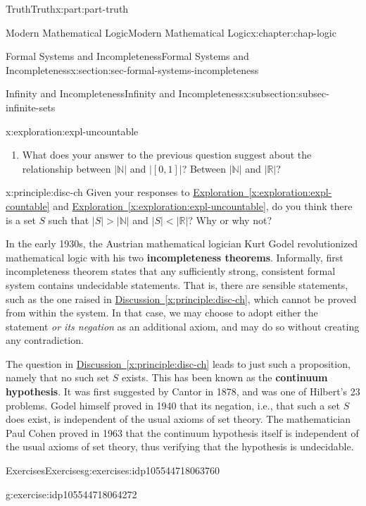 \documentclass[oneside,10pt,]{book}
\newcommand{\xreffont}{\relax}
\newcommand{\terminology}[1]{\textbf{#1}}
\numberwithin{equation}{section}
\newcommand{\lt}{<}
\newcommand{\gt}{>}
\begin{document}
\begin{partptx}{Truth}{}{Truth}{}{}{x:part:part-truth}
\begin{chapterptx}{Modern Mathematical Logic}{}{Modern Mathematical Logic}{}{}{x:chapter:chap-logic}
\begin{sectionptx}{Formal Systems and Incompleteness}{}{Formal Systems and Incompleteness}{}{}{x:section:sec-formal-systems-incompleteness}
\begin{subsectionptx}{Infinity and Incompleteness}{}{Infinity and Incompleteness}{}{}{x:subsection:subsec-infinite-sets}
\begin{exploration}{}{x:exploration:expl-uncountable}
\begin{enumerate}
\item{}What does your answer to the previous question suggest about the relationship between \(|\mathbb{N}|\) and \(|[0,1]|\)? Between \(|\mathbb{N}|\) and \(|\mathbb{R}|\)?%
\end{enumerate}
\end{exploration}%
\begin{principle}{}{}{x:principle:disc-ch}%
Given your responses to \hyperref[x:exploration:expl-countable]{Exploration~{\xreffont\ref{x:exploration:expl-countable}}} and \hyperref[x:exploration:expl-uncountable]{Exploration~{\xreffont\ref{x:exploration:expl-uncountable}}}, do you think there is a set \(S\) such that \(|S| \gt |\mathbb{N}|\) and \(|S| \lt |\mathbb{R}|\)? Why or why not?%
\end{principle}
 In the early 1930s, the Austrian mathematical logician Kurt Godel revolutionized mathematical logic with his two \terminology{incompleteness theorems}. Informally, first incompleteness theorem states that any sufficiently strong, consistent formal system contains undecidable statements. That is, there are sensible statements, such as the one raised in \hyperref[x:principle:disc-ch]{Discussion~{\xreffont\ref{x:principle:disc-ch}}}, which cannot be proved from within the system. In that case, we may choose to adopt either the statement \emph{or its negation} as an additional axiom, and may do so without creating any contradiction.%
\par
The question in \hyperref[x:principle:disc-ch]{Discussion~{\xreffont\ref{x:principle:disc-ch}}} leads to just such a proposition, namely that no such set \(S\) exists. This has been known as the \terminology{continuum hypothesis}. It was first suggested by Cantor in 1878, and was one of Hilbert's 23 problems. Godel himself proved in 1940 that its negation, i.e., that such a set \(S\) does exist, is independent of the usual axioms of set theory. The mathematician Paul Cohen proved in 1963 that the continuum hypothesis itself is independent of the usual axioms of set theory, thus verifying that the hypothesis is undecidable.%
\end{subsectionptx}
%
%
\typeout{************************************************}
\typeout{************************************************}
%
\begin{exercises-subsection}{Exercises}{}{Exercises}{}{}{g:exercises:idp105544718063760}
\begin{divisionexercise}{1}{}{}{g:exercise:idp105544718064272}%

\end{divisionexercise}
\end{exercises-subsection}
\end{sectionptx}
\end{chapterptx}
\end{partptx}
\end{document}
